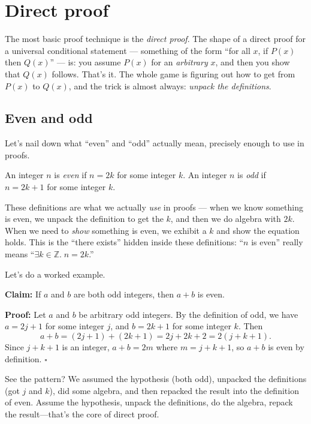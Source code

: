 \documentclass[11pt]{article}
\begin{document}
\section{Direct proof}

The most basic proof technique is the \emph{direct proof}. The shape of a direct proof for a universal conditional statement --- something of the form ``for all $x$, if $P(x)$ then $Q(x)$'' --- is: you assume $P(x)$ for an \emph{arbitrary} $x$, and then you show that $Q(x)$ follows. That's it. The whole game is figuring out how to get from $P(x)$ to $Q(x)$, and the trick is almost always: \emph{unpack the definitions}.

\subsection*{Even and odd}

Let's nail down what ``even'' and ``odd'' actually mean, precisely enough to use in proofs.

\begin{definition}
An integer $n$ is \emph{even} if $n = 2k$ for some integer $k$. An integer $n$ is \emph{odd} if $n = 2k + 1$ for some integer $k$.
\end{definition}

These definitions are what we actually \emph{use} in proofs --- when we know something is even, we unpack the definition to get the $k$, and then we do algebra with $2k$. When we need to \emph{show} something is even, we exhibit a $k$ and show the equation holds. This is the ``there exists'' hidden inside these definitions: ``$n$ is even'' really means ``$\exists k \in \mathbb{Z}.\; n = 2k$.''

Let's do a worked example.

\textbf{Claim:} If $a$ and $b$ are both odd integers, then $a + b$ is even.

\textbf{Proof:} Let $a$ and $b$ be arbitrary odd integers. By the definition of odd, we have $a = 2j + 1$ for some integer $j$, and $b = 2k + 1$ for some integer $k$. Then
\[
  a + b = (2j + 1) + (2k + 1) = 2j + 2k + 2 = 2(j + k + 1).
\]
Since $j + k + 1$ is an integer, $a + b = 2m$ where $m = j + k + 1$, so $a + b$ is even by definition. \hfill $\square$

See the pattern? We assumed the hypothesis (both odd), unpacked the definitions (got $j$ and $k$), did some algebra, and then repacked the result into the definition of even. Assume the hypothesis, unpack the definitions, do the algebra, repack the result---that's the core of direct proof.
\end{document}
